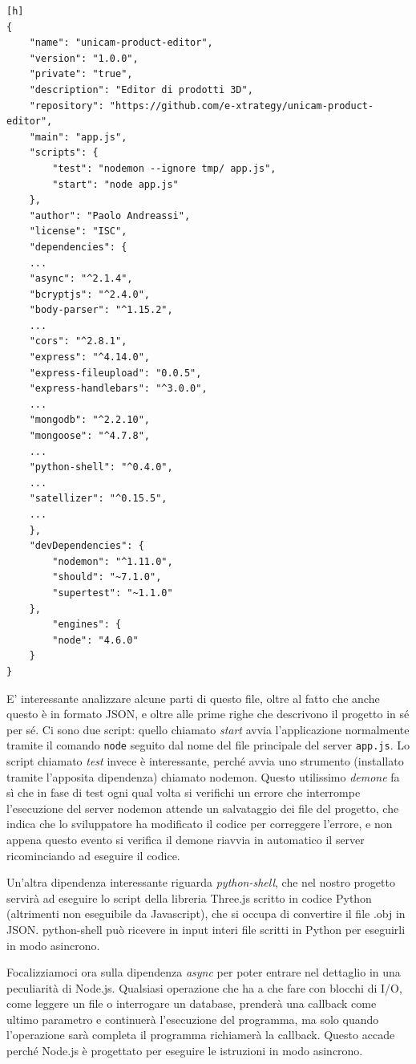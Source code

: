 \begin{lstlisting}[caption={package.json}, style=javaScriptCode][h]
{
	"name": "unicam-product-editor",
	"version": "1.0.0",
	"private": "true",
	"description": "Editor di prodotti 3D",
	"repository": "https://github.com/e-xtrategy/unicam-product-editor",
	"main": "app.js",
	"scripts": {
		"test": "nodemon --ignore tmp/ app.js",
		"start": "node app.js"
	},
	"author": "Paolo Andreassi",
	"license": "ISC",
	"dependencies": {
	...
	"async": "^2.1.4",
	"bcryptjs": "^2.4.0",
	"body-parser": "^1.15.2",
	...
	"cors": "^2.8.1",
	"express": "^4.14.0",
	"express-fileupload": "0.0.5",
	"express-handlebars": "^3.0.0",
	...
	"mongodb": "^2.2.10",
	"mongoose": "^4.7.8",
	...
	"python-shell": "^0.4.0",
	...
	"satellizer": "^0.15.5",
	...
	},
	"devDependencies": {
		"nodemon": "^1.11.0",
		"should": "~7.1.0",
		"supertest": "~1.1.0"
	},
		"engines": {
		"node": "4.6.0"
	}
}
\end{lstlisting}
\newpage
E' interessante analizzare alcune parti di questo file, oltre al fatto che anche questo è in formato JSON, e oltre alle prime righe che descrivono il progetto in sé per sé.
Ci sono due script: quello chiamato \emph{start} avvia l'applicazione normalmente tramite il comando \texttt{node} seguito dal nome del file principale del server \texttt{app.js}.
Lo script chiamato \emph{test} invece è interessante, perché avvia uno strumento (installato tramite l'apposita dipendenza) chiamato nodemon. Questo utilissimo \emph{demone} fa sì che in fase di test ogni qual volta si verifichi un errore che interrompe l'esecuzione del server nodemon attende un salvataggio dei file del progetto, che indica che lo sviluppatore ha modificato il codice per correggere l'errore, e non appena questo evento si verifica il demone riavvia in automatico il server ricominciando ad eseguire il codice.

Un'altra dipendenza interessante riguarda \emph{python-shell}, che nel nostro progetto servirà ad eseguire lo script della libreria Three.js scritto in codice Python (altrimenti non eseguibile da Javascript), che si occupa di convertire il file .obj in JSON. python-shell può ricevere in input interi file scritti in Python per eseguirli in modo asincrono.

Focalizziamoci ora sulla dipendenza \emph{async} per poter entrare nel dettaglio in una peculiarità di Node.js.
Qualsiasi operazione che ha a che fare con blocchi di I/O, come leggere un file o interrogare un database, prenderà una callback come ultimo parametro e continuerà l'esecuzione del programma, ma
solo quando l'operazione sarà completa il programma richiamerà la callback. Questo accade perché Node.js è progettato per eseguire le istruzioni in modo asincrono.

